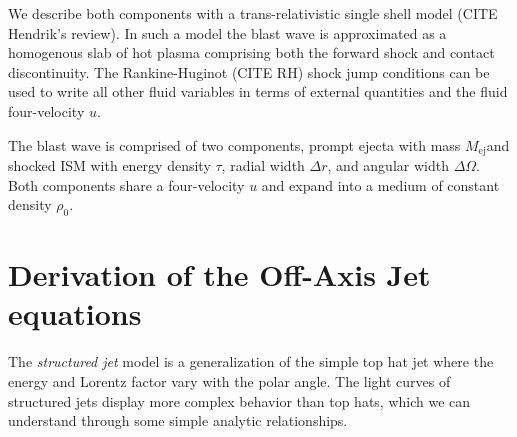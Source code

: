 \documentclass[modern]{aastex62}
\newcommand{\Mej}{\ensuremath{M_{\mathrm{ej}}}}
\begin{document}
	We describe both components with a trans-relativistic single shell model (CITE Hendrik's review).  In such a model the blast wave is approximated as a homogenous slab of hot plasma comprising both the forward shock and contact discontinuity.  The Rankine-Huginot (CITE RH) shock jump conditions can be used to write all other fluid variables in terms of external quantities and the fluid four-velocity $u$. 
	
	The blast wave is comprised of two components, prompt ejecta with mass \Mej and shocked ISM with energy density $\tau$, radial width $\Delta r$, and angular width $\Delta \Omega$. Both components share a four-velocity $u$ and expand into a medium of constant density $\rho_0$.  


\appendix
\section{Derivation of the Off-Axis Jet equations}\label{sec:derive1}

  The \emph{structured jet} model is a generalization of the simple top hat jet where the energy and Lorentz factor vary with the polar angle.  The light curves of structured jets display more complex behavior than top hats, which we can understand through some simple analytic relationships.
  
\end{document}

